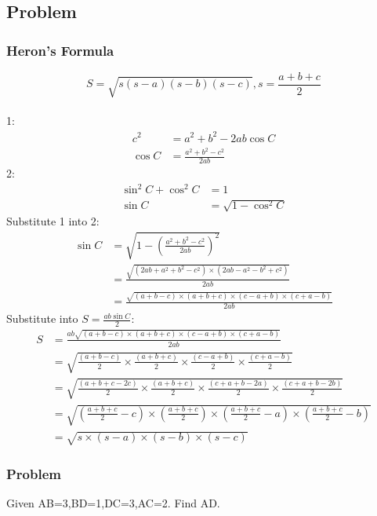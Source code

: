 \documentclass{article}
\begin{document}
\subsection{Problem}
\subsubsection{Heron's Formula}
$$S= \sqrt {s (s-a) (s-b) (s-c)}, s=\frac{a+b+c}{2}$$\\
1:
\begin{align*} 
c^2&=a^2+b^2-2ab\cos C\\
\cos C&=\frac{a^2+b^2-c^2}{2ab}
\end{align*}
2: 
\begin{align*}    
\sin ^2 C+\cos ^2 C&=1\\
\sin C&=\sqrt{1-\cos ^2 C}
\end{align*}
Substitute 1 into 2: 
\begin{align*} 
\sin C&=\sqrt{1-(\frac{a^2+b^2-c^2}{2ab})^2}\\
&=\frac{\sqrt{(2ab+a^2+b^2-c^2)\times (2ab-a^2-b^2+c^2)}}{2ab}\\
&=\frac{\sqrt{(a+b-c)\times (a+b+c)\times (c-a+b)\times (c+a-b)}}{2ab}
\end{align*}
Substitute into $S=\frac{ab\sin C}{2}$:
\begin{align*}
    S&=\frac{ab\sqrt{(a+b-c)\times (a+b+c)\times (c-a+b)\times (c+a-b)}}{2ab}\\
    &=\sqrt{\frac{(a+b-c)}{2}\times \frac{(a+b+c)}{2}\times \frac{(c-a+b)}{2}\times \frac{(c+a-b)}{2}}\\
    &=\sqrt{\frac{(a+b+c-2c)}{2}\times \frac{(a+b+c)}{2}\times \frac{(c+a+b-2a)}{2}\times \frac{(c+a+b-2b)}{2}}\\
    &=\sqrt{(\frac{a+b+c}{2}-c)\times (\frac{a+b+c}{2})\times (\frac{a+b+c}{2}-a)\times (\frac{a+b+c}{2}-b)}\\
    &=\sqrt{s\times (s-a)\times(s-b)\times(s-c)}
\end{align*}
\pagebreak


\subsubsection{Problem}
Given AB=3,BD=1,DC=3,AC=2. Find AD.
\end{document}
